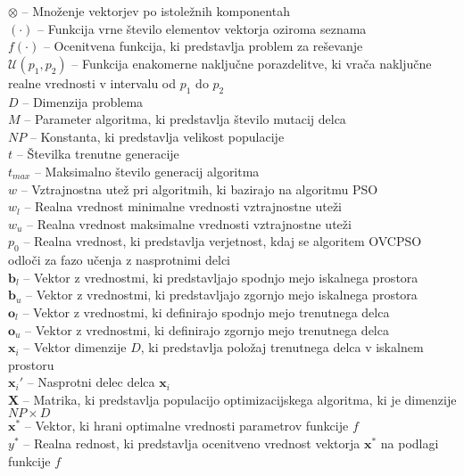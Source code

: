 $\otimes$ -- Množenje vektorjev po istoležnih komponentah \\
\ell$(\cdot)$ -- Funkcija vrne število elementov vektorja oziroma seznama \\
$f(\cdot)$ -- Ocenitvena funkcija, ki predstavlja problem za reševanje \\
$\mathcal{U}(p_1, p_2)$ -- Funkcija enakomerne naključne porazdelitve, ki vrača naključne realne vrednosti v intervalu od $p_1$ do $p_2$ \\
$\mathit{D}$ -- Dimenzija problema \\
$\mathit{M}$ -- Parameter algoritma, ki predstavlja število mutacij delca \\
$\mathit{NP}$ -- Konstanta, ki predstavlja velikost populacije \\
$t$ -- Številka trenutne generacije \\
$t_{max}$ -- Maksimalno število generacij algoritma \\
$w$ -- Vztrajnostna utež pri algoritmih, ki bazirajo na algoritmu PSO \\
$w_l$ -- Realna vrednost minimalne vrednosti vztrajnostne uteži \\
$w_u$ -- Realna vrednost maksimalne vrednosti vztrajnostne uteži \\
$p_0$ -- Realna vrednost, ki predstavlja verjetnost, kdaj se algoritem OVCPSO odloči za fazo učenja z nasprotnimi delci \\
$\mathbf{b}_{l}$ -- Vektor z vrednostmi, ki predstavljajo spodnjo mejo iskalnega prostora \\
$\mathbf{b}_{u}$ -- Vektor z vrednostmi, ki predstavljajo zgornjo mejo iskalnega prostora \\
$\mathbf{o}_l$ -- Vektor z vrednostmi, ki definirajo spodnjo mejo trenutnega delca \\
$\mathbf{o}_u$ -- Vektor z vrednostmi, ki definirajo zgornjo mejo trenutnega delca \\
$\mathbf{x}_i$ -- Vektor dimenzije $\mathit{D}$, ki predstavlja položaj trenutnega delca v iskalnem prostoru \\
$\mathbf{x}_i'$ -- Nasprotni delec delca $\mathbf{x}_i$ \\
$\mathbf{X}$ -- Matrika, ki predstavlja populacijo optimizacijskega algoritma, ki je dimenzije $\mathit{NP} \times \mathit{D}$ \\
$\mathbf{x}^*$ -- Vektor, ki hrani optimalne vrednosti parametrov funkcije $f$ \\
$y^*$ -- Realna rednost, ki predstavlja ocenitveno vrednost vektorja $\mathbf{x}^*$ na podlagi funkcije $f$ \\

